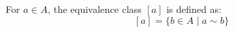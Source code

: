 \documentclass[preview]{standalone}
\begin{document}
\begin{center}
For $a \in A$, the equivalence class $[a]$ is defined as:\[ [a] = \{ b \in A \mid a \sim b \} \]
\end{center}
\end{document}
